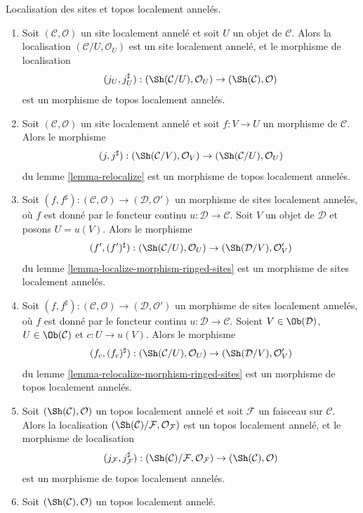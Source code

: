 \begin{lemma}
\label{lemma-localize-morphism-locally-ringed-topoi}
Localisation des sites et topos localement annelés.
\begin{enumerate}
\item Soit $(\mathcal{C}, \mathcal{O})$ un site localement annelé et soit $U$
un objet de $\mathcal{C}$. Alors la localisation
$(\mathcal{C}/U, \mathcal{O}_U)$ est un site localement annelé, et le morphisme
de localisation
$$
(j_U, j_U^\sharp) :
(\Sh(\mathcal{C}/U), \mathcal{O}_U)
\to
(\Sh(\mathcal{C}), \mathcal{O})
$$
est un morphisme de topos localement annelés.
\item Soit $(\mathcal{C}, \mathcal{O})$ un site localement annelé et soit
$f : V \to U$ un morphisme de $\mathcal{C}$. Alors le morphisme
$$
(j, j^\sharp) :
(\Sh(\mathcal{C}/V), \mathcal{O}_V)
\to
(\Sh(\mathcal{C}/U), \mathcal{O}_U)
$$
du lemme \ref{lemma-relocalize} est un morphisme de topos localement annelés.
\item Soit
$(f, f^\sharp) :
(\mathcal{C}, \mathcal{O})
\longrightarrow
(\mathcal{D}, \mathcal{O}')$
un morphisme de sites localement annelés, où $f$ est donné par le foncteur
continu $u : \mathcal{D} \to \mathcal{C}$. Soit $V$ un objet de $\mathcal{D}$
et posons $U = u(V)$. Alors le morphisme
$$
(f', (f')^\sharp) :
(\Sh(\mathcal{C}/U), \mathcal{O}_U)
\to
(\Sh(\mathcal{D}/V), \mathcal{O}'_V)
$$
du lemme \ref{lemma-localize-morphism-ringed-sites} est un morphisme de sites
localement annelés.
\item Soit
$(f, f^\sharp) :
(\mathcal{C}, \mathcal{O})
\longrightarrow
(\mathcal{D}, \mathcal{O}')$
un morphisme de sites localement annelés, où $f$ est donné par le foncteur
continu $u : \mathcal{D} \to \mathcal{C}$. Soient
$V \in \Ob(\mathcal{D})$, $U \in \Ob(\mathcal{C})$ et $c : U \to u(V)$.
Alors le morphisme
$$
(f_c, (f_c)^\sharp) :
(\Sh(\mathcal{C}/U), \mathcal{O}_U)
\to
(\Sh(\mathcal{D}/V), \mathcal{O}'_V)
$$
du lemme \ref{lemma-relocalize-morphism-ringed-sites} est un morphisme de topos
localement annelés.
\item Soit $(\Sh(\mathcal{C}), \mathcal{O})$ un topos localement annelé et
soit $\mathcal{F}$ un faisceau sur $\mathcal{C}$. Alors la localisation
$(\Sh(\mathcal{C})/\mathcal{F}, \mathcal{O}_\mathcal{F})$
est un topos localement annelé, et le morphisme de localisation
$$
(j_\mathcal{F}, j_\mathcal{F}^\sharp) :
(\Sh(\mathcal{C})/\mathcal{F}, \mathcal{O}_\mathcal{F})
\to
(\Sh(\mathcal{C}), \mathcal{O})
$$
est un morphisme de topos localement annelés.
\item Soit $(\Sh(\mathcal{C}), \mathcal{O})$ un topos localement annelé.

\end{enumerate}
\end{lemma}
